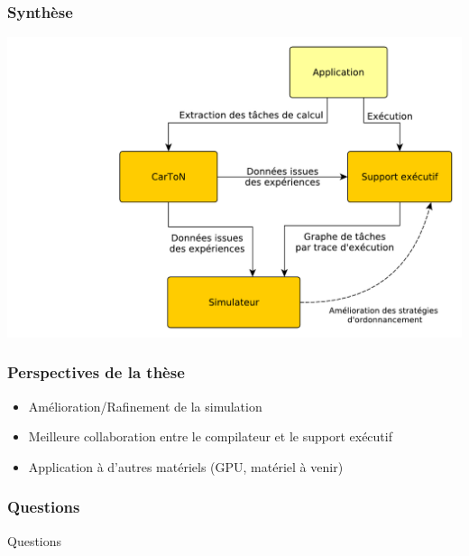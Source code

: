 \documentclass[xcolor={usenames,dvipsnames,svgnames,table}, aspectratio=43]{beamer}
\begin{document}
\begin{frame}
  \frametitle{Synthèse}

    \includegraphics[width=\textwidth]{graph/big_picture.pdf}
\end{frame}


\begin{frame}
  \frametitle{Perspectives de la thèse}

  \begin{itemize}
    \item Amélioration/Rafinement de la simulation

    \item Meilleure collaboration entre le compilateur et le support exécutif

    \item Application à d'autres matériels (GPU, matériel à venir)
  \end{itemize}
\end{frame}

\begin{frame}
  \frametitle{Questions}

  Questions

\end{frame}
\end{document}
